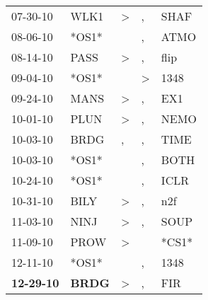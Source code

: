 \begin{supertabular}{p{0.07\textwidth}p{0.06\textwidth}p{0.02\textwidth}p{0.02\textwidth}p{0.06\textwidth}}
          07-30-10\textsuperscript{} &           WLK1\textsuperscript{} &     \textgreater &                , &           SHAF\textsuperscript{} \\
          08-06-10\textsuperscript{} &                            *OS1* &                  &                , &           ATMO\textsuperscript{} \\
          08-14-10\textsuperscript{} &           PASS\textsuperscript{} &     \textgreater &                , &           flip\textsuperscript{} \\
          09-04-10\textsuperscript{} &                            *OS1* &                  &     \textgreater &           1348\textsuperscript{} \\
          09-24-10\textsuperscript{} &           MANS\textsuperscript{} &     \textgreater &                , &            EX1\textsuperscript{} \\
          10-01-10\textsuperscript{} &           PLUN\textsuperscript{} &     \textgreater &                , &           NEMO\textsuperscript{} \\
          10-03-10\textsuperscript{} &           BRDG\textsuperscript{} &                , &                , &           TIME\textsuperscript{} \\
          10-03-10\textsuperscript{} &                            *OS1* &                  &                , &           BOTH\textsuperscript{} \\
          10-24-10\textsuperscript{} &                            *OS1* &                  &                , &           ICLR\textsuperscript{} \\
          10-31-10\textsuperscript{} &           BILY\textsuperscript{} &     \textgreater &                , &            n2f\textsuperscript{} \\
          11-03-10\textsuperscript{} &           NINJ\textsuperscript{} &     \textgreater &                , &           SOUP\textsuperscript{} \\
          11-09-10\textsuperscript{} &           PROW\textsuperscript{} &     \textgreater &                  &                            *CS1* \\
          12-11-10\textsuperscript{} &                            *OS1* &                  &                , &           1348\textsuperscript{} \\
 \textbf{12-29-10\textsuperscript{}} &  \textbf{BRDG\textsuperscript{}} &     \textgreater &                , &            FIR\textsuperscript{} \\

\end{supertabular}
